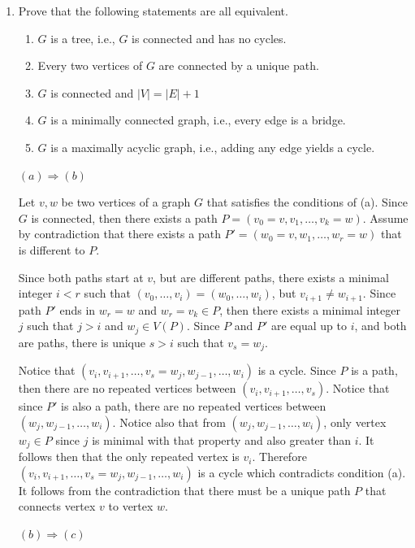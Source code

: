 \begin{enumerate}
    \item Prove that the following statements are all equivalent.
        \begin{enumerate}
            \item $G$ is a tree, i.e., $G$ is connected and has no cycles.
            \item Every two vertices of $G$ are connected by a unique path.
            \item $G$ is connected and $\lvert V \rvert = \lvert E \rvert + 1 $
            \item $G$ is a minimally connected graph, i.e., every edge is a bridge.
            \item $G$ is a maximally acyclic graph, i.e., adding any edge yields a cycle.
        \end{enumerate}
        
        \underline{$(a) \Rightarrow (b)$}
        
        Let $v, w$ be two vertices of a graph $G$ that satisfies the conditions of (a). Since $G$ is connected, then there exists a path $P = (v_0 = v, v_1, \ldots , v_k = w)$. Assume by contradiction that there exists a path $P' = (w_0 = v, w_1, \ldots, w_r = w)$ that is different to $P$. 
        
        Since both paths start at $v$, but are different paths, there exists a minimal integer $i<r$ such that $(v_0, \ldots, v_i) = (w_0, \ldots, w_i)$, but $v_{i+1} \neq w_{i+1}$. Since path $P'$ ends in $w_r=w$ and $w_r = v_k \in P$, then there exists  a minimal integer $j$ such that $j>i$ and $w_j \in V(P)$. Since $P$ and $P'$ are equal up to $i$, and both are paths, there is unique $s>i$ such that $v_s = w_j$.
        
        Notice that $(v_i, v_{i+1}, \ldots, v_s = w_j, w_{j-1}, \ldots, w_i)$ is a cycle. Since $P$ is a path, then there are no repeated vertices between $(v_i,v_{i+1}, \ldots, v_s)$. Notice that since $P'$ is also a path, there are no repeated vertices between $(w_j, w_{j-1}, \ldots, w_i)$. Notice also that from $(w_j, w_{j-1}, \ldots, w_i)$, only vertex $w_j \in P$ since $j$ is minimal with that property and also greater than $i$. It follows then that the only repeated vertex is $v_i$. Therefore $(v_i, v_{i+1}, \ldots, v_s = w_j, w_{j-1}, \ldots, w_i)$ is a cycle which contradicts condition (a). It follows from the contradiction that there must be a unique path $P$ that connects vertex $v$ to vertex $w$.
        
        \underline{$(b) \Rightarrow (c)$}
        

\end{enumerate}
